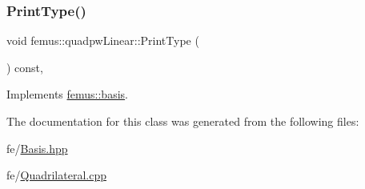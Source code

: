 \subsubsection{\texorpdfstring{Print\+Type()}{PrintType()}}
{\footnotesize\ttfamily void femus\+::quadpw\+Linear\+::\+Print\+Type (\begin{DoxyParamCaption}{ }\end{DoxyParamCaption}) const\hspace{0.3cm}{\ttfamily [inline]}, {\ttfamily [virtual]}}



Implements \mbox{\hyperlink{classfemus_1_1basis_abbae7bf8f31ec5793c911bc6d4ea0572}{femus\+::basis}}.



The documentation for this class was generated from the following files\+:\begin{DoxyCompactItemize}
\item 
fe/\mbox{\hyperlink{_basis_8hpp}{Basis.\+hpp}}\item 
fe/\mbox{\hyperlink{_quadrilateral_8cpp}{Quadrilateral.\+cpp}}\end{DoxyCompactItemize}
